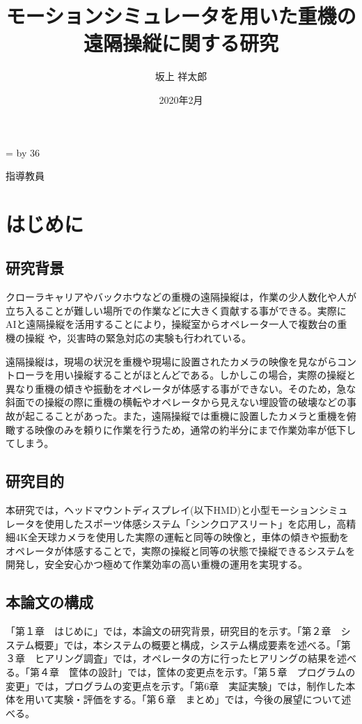 \documentclass[a4paper,12pt]{jsarticle}
\title{モーションシミュレータを用いた重機の遠隔操縦に関する研究} %
\date{2020年2月} %
\author{坂上 祥太郎} %
\makeatletter
\renewcommand{\maketitle}{
  \begin{titlepage}
    \centering
    {\fontsize{18pt}{36pt}\selectfont \@yearnendo{卒業研究}\par}
    \vspace{42pt}
    \vspace{42pt}
    \vspace{42pt}
    {\huge\textsf{\@title}\par}
    \vspace{42pt}
    \vspace{42pt}
    \vspace{42pt}
    {\fontsize{14pt}{42pt}\selectfont {東京工業高等専門学校　情報工学科}\par}
    {\fontsize{14pt}{42pt}\selectfont \@lab\par}
    {\fontsize{14pt}{42pt}\selectfont {学籍番号:\@studentschoolid}\par}
    {\fontsize{14pt}{42pt}\selectfont {\@studentclassid　\@author}\par}
    \vspace{28pt}
    {\fontsize{14pt}{28pt}\selectfont 指導教員　\@professor\par}
  
    \vfill
  
  \end{titlepage}
}
\def\linesparpage#1{
    \baselineskip=\textheight
    \divide\baselineskip by #1
}
\makeatother
\begin{document}
\linesparpage{36} %

\maketitle

\tableofcontents
\thispagestyle{empty}
\clearpage

\setcounter{page}{1}
\pagestyle{plain}

\section{はじめに}

\subsection{研究背景}
クローラキャリアやバックホウなどの重機の遠隔操縦は，作業の少人数化や人が立ち入ることが難しい場所での作業などに大きく貢献する事ができる。実際にAIと遠隔操縦を活用することにより，操縦室からオペレータ一人で複数台の重機の操縦 \cite{kumagai_AI}や，災害時の緊急対応の実験\cite{kumagai_mujin}も行われている。

遠隔操縦は，現場の状況を重機や現場に設置されたカメラの映像を見ながらコントローラを用い操縦することがほとんどである。しかしこの場合，実際の操縦と異なり重機の傾きや振動をオペレータが体感する事ができない。そのため，急な斜面での操縦の際に重機の横転やオペレータから見えない埋設管の破壊などの事故が起こることがあった。また，遠隔操縦では重機に設置したカメラと重機を俯瞰する映像のみを頼りに作業を行うため，通常の約半分にまで作業効率が低下してしまう。\cite{nec}

\subsection{研究目的}
本研究では，ヘッドマウントディスプレイ(以下HMD)と小型モーションシミュレータを使用したスポーツ体感システム「シンクロアスリート」を応用し，高精細4K全天球カメラを使用した実際の運転と同等の映像と，車体の傾きや振動をオペレータが体感することで，実際の操縦と同等の状態で操縦できるシステムを開発し，安全安心かつ極めて作業効率の高い重機の運用を実現する。

\subsection{本論文の構成}
「第１章　はじめに」では，本論文の研究背景，研究目的を示す。「第２章　システム概要」では，本システムの概要と構成，システム構成要素を述べる。「第３章　ヒアリング調査」では，オペレータの方に行ったヒアリングの結果を述べる。「第４章　筐体の設計」では，筐体の変更点を示す。「第５章　プログラムの変更」では，プログラムの変更点を示す。「第6章　実証実験」では，制作した本体を用いて実験・評価をする。「第６章　まとめ」では，今後の展望について述べる。
\end{document}
